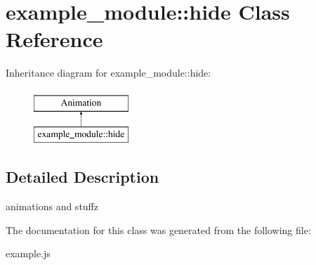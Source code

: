 \hypertarget{classexample__module_1_1hide}{\section{example\-\_\-module\-:\-:hide Class Reference}
\label{classexample__module_1_1hide}
}
Inheritance diagram for example\-\_\-module\-:\-:hide\-:\begin{figure}[H]
\begin{center}
\leavevmode
\includegraphics[height=2.000000cm]{classexample__module_1_1hide}
\end{center}
\end{figure}


\subsection{Detailed Description}
animations and stuffz 

The documentation for this class was generated from the following file\-:\begin{DoxyCompactItemize}
\item 
example.\-js\end{DoxyCompactItemize}
